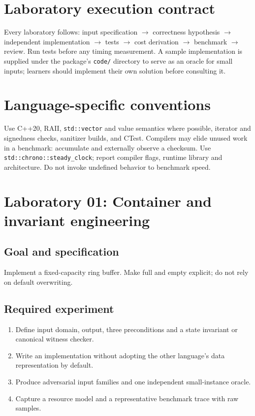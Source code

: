 \documentclass[11pt,letterpaper]{article}
\begin{document}
\tableofcontents
\clearpage
{}
\section{Laboratory execution contract}
Every laboratory follows: input specification $\rightarrow$ correctness hypothesis $\rightarrow$ independent implementation $\rightarrow$ tests $\rightarrow$ cost derivation $\rightarrow$ benchmark $\rightarrow$ review. Run tests before any timing measurement. A sample implementation is supplied under the package's \texttt{code/} directory to serve as an oracle for small inputs; learners should implement their own solution before consulting it.
\section{Language-specific conventions}

Use C++20, RAII, \texttt{std::vector} and value semantics where possible, iterator and signedness checks, sanitizer builds, and CTest. Compilers may elide unused work in a benchmark: accumulate and externally observe a checksum. Use \texttt{std::chrono::steady\_clock}; report compiler flags, runtime library and architecture. Do not invoke undefined behavior to benchmark speed.
\section{Laboratory 01: Container and invariant engineering}
\subsection{Goal and specification}
Implement a fixed-capacity ring buffer. Make full and empty explicit; do not rely on default overwriting.
\subsection{Required experiment}
\begin{enumerate}
\item Define input domain, output, three preconditions and a state invariant or canonical witness checker.
\item Write an implementation without adopting the other language's data representation by default.
\item Produce adversarial input families and one independent small-instance oracle.
\item Capture a resource model and a representative benchmark trace with raw samples.
\end{enumerate}
\end{document}
